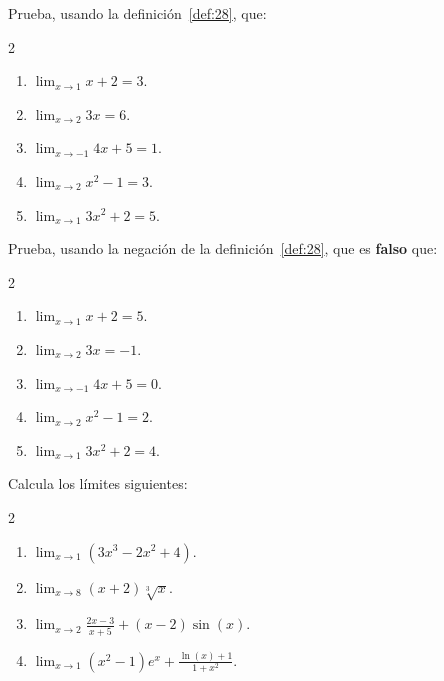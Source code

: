 \documentclass[12pt,a4paper]{book}
\begin{document}
    \begin{ejercicio}\label{ej:139}
        Prueba, usando la definición~\ref{def:28}, que:
        \begin{multicols}{2}
        \begin{enumerate}[nosep]
            \item $\lim_{x\to 1}x+2=3$.
            \item $\lim_{x\to 2}3x=6$.
            \item $\lim_{x\to -1}4x+5=1$.
            \item $\lim_{x\to 2}x^{2}-1=3$.
            \item $\lim_{x\to 1}3x^{2}+2=5$.
        \end{enumerate}
        \end{multicols}
    \end{ejercicio}

    \begin{ejercicio}\label{ej:140}
        Prueba, usando la negación de la definición~\ref{def:28}, que es \textbf{falso}
        que:
        \begin{multicols}{2}
        \begin{enumerate}[nosep]
            \item $\lim_{x\to 1}x+2=5$.
            \item $\lim_{x\to 2}3x=-1$.
            \item $\lim_{x\to -1}4x+5=0$.
            \item $\lim_{x\to 2}x^{2}-1=2$.
            \item $\lim_{x\to 1}3x^{2}+2=4$.
        \end{enumerate}
        \end{multicols}
    \end{ejercicio}

    \begin{ejercicio}\label{ej:141}
        Calcula los límites siguientes:
        \begin{multicols}{2}
        \begin{enumerate}[nosep]
            \item $\lim_{x\to 1}(3x^{3}-2x^{2}+4)$.
            \item $\lim_{x\to 8}(x+2)\sqrt[3]{x}$.
            \item $\lim_{x\to 2}\frac{2x-3}{x+5}+(x-2)\sin(x)$.
            \item $\lim_{x\to 1}\left(x^{2}-1\right)e^{x}+\frac{\ln(x)+1}{1+x^{2}}$.
        \end{enumerate}
        \end{multicols}
    \end{ejercicio}
\end{document}
